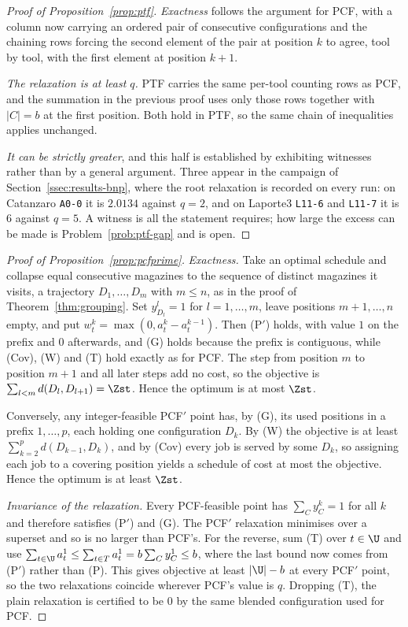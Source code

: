 \begin{proof}[Proof of Proposition~\ref{prop:ptf}]
\emph{Exactness} follows the argument for PCF, with a column now carrying an ordered
pair of consecutive configurations and the chaining rows forcing the second element of
the pair at position $k$ to agree, tool by tool, with the first element at position
$k+1$.

\emph{The relaxation is at least $q$.} PTF carries the same per-tool counting rows as
PCF, and the summation in the previous proof uses only those rows together with
$\lvert C\rvert=b$ at the first position. Both hold in PTF, so the same chain of
inequalities applies unchanged.

\emph{It can be strictly greater}, and this half is established by exhibiting witnesses
rather than by a general argument. Three appear in the campaign of
Section~\ref{ssec:results-bnp}, where the root relaxation is recorded on every run: on
Catanzaro \texttt{A0-0} it is $2.0134$ against $q=2$, and on Laporte3 \texttt{L11-6} and
\texttt{L11-7} it is $6$ against $q=5$. A witness is all the statement requires; how
large the excess can be made is Problem~\ref{prob:ptf-gap} and is open.
\end{proof}

\begin{proof}[Proof of Proposition~\ref{prop:pcfprime}]
\emph{Exactness.} Take an optimal schedule and collapse equal consecutive magazines to
the sequence of distinct magazines it visits, a trajectory $D_1,\dots,D_m$ with
$m\le n$, as in the proof of Theorem~\ref{thm:grouping}. Set $y^{l}_{D_l}=1$ for
$l=1,\dots,m$, leave positions $m+1,\dots,n$ empty, and put
$w_t^{k}=\max(0,a_t^{k}-a_t^{k-1})$. Then (P$'$) holds, with value $1$ on the prefix
and $0$ afterwards, and (G) holds because the prefix is contiguous, while (Cov), (W)
and (T) hold exactly as for PCF. The step from position $m$ to position $m+1$ and all
later steps add no cost, so the objective is
$\sum_{l<m}d(D_l,D_{l+1})=\Zst$. Hence the optimum is at most $\Zst$.

Conversely, any integer-feasible PCF$'$ point has, by (G), its used positions in a
prefix $1,\dots,p$, each holding one configuration $D_k$. By (W) the objective is at
least $\sum_{k=2}^{p}d(D_{k-1},D_k)$, and by (Cov) every job is served by some $D_k$,
so assigning each job to a covering position yields a schedule of cost at most the
objective. Hence the optimum is at least $\Zst$.

\emph{Invariance of the relaxation.} Every PCF-feasible point has $\sum_C y_C^{k}=1$
for all $k$ and therefore satisfies (P$'$) and (G). The PCF$'$ relaxation minimises
over a superset and so is no larger than PCF's. For the reverse, sum (T) over
$t\in\U$ and use
$\sum_{t\in\U}a_t^{1}\le\sum_{t\in T}a_t^{1}=b\sum_C y_C^{1}\le b$, where the last
bound now comes from (P$'$) rather than (P). This gives objective at least
$\lvert\U\rvert-b$ at every PCF$'$ point, so the two relaxations coincide wherever
PCF's value is $q$. Dropping (T), the plain relaxation is certified to be $0$ by the
same blended configuration used for PCF.
\end{proof}
